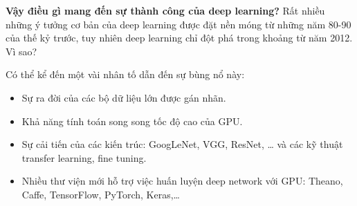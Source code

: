 \documentclass[a4paper, 12pt]{report}
\begin{document}
\textbf{Vậy điều gì mang đến sự thành công của deep learning?} Rất nhiều những ý tưởng cơ bản của deep learning được đặt nền móng từ những năm 80-90 của thế kỷ trước, tuy nhiên deep learning chỉ đột phá trong khoảng từ năm 2012. Vì sao?\par
Có thể kể đến một vài nhân tố dẫn đến sự bùng nổ này:
\begin{itemize}
	\item Sự ra đời của các bộ dữ liệu lớn được gán nhãn.
	\item Khả năng tính toán song song tốc độ cao của GPU.
	\item Sự cải tiến của các kiến trúc: GoogLeNet, VGG, ResNet, … và các kỹ thuật transfer learning, fine tuning.
	\item Nhiều thư viện mới hỗ trợ việc huấn luyện deep network với GPU: Theano, Caffe, TensorFlow, PyTorch, Keras,\dots
\end{itemize}
\end{document}
